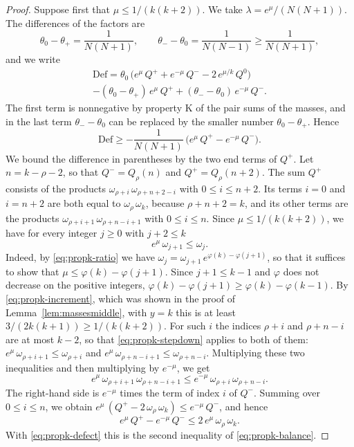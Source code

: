 \documentclass{amsart}
\theoremstyle{definition}
\theoremstyle{remark}
\numberwithin{equation}{section}
\begin{document}
\begin{proof}
Suppose first that $\mu\le1/(k(k+2))$. We take $\lambda=e^{\mu}/(N(N+1))$.
The differences of the factors are
\[
\theta_0-\theta_+=\frac{1}{N(N+1)},\qquad
\theta_--\theta_0=\frac{1}{N(N-1)}\ge\frac{1}{N(N+1)} ,
\]
and we write
\begin{multline*}
\mathrm{Def}=\theta_0\,\bigl(e^{\mu}\,Q^{+}+e^{-\mu}\,Q^{-}
-2\,e^{\mu/k}\,Q^{0}\bigr)\\
-(\theta_0-\theta_+)\,e^{\mu}\,Q^{+}+(\theta_--\theta_0)\,e^{-\mu}\,Q^{-}.
\end{multline*}
The first term is nonnegative by property K of the pair sums of the masses,
and in the
last term $\theta_--\theta_0$ can be replaced by the smaller number
$\theta_0-\theta_+$. Hence
\begin{equation}\label{eq:propk-defect}
\mathrm{Def}\ge-\frac{1}{N(N+1)}\,
\bigl(e^{\mu}\,Q^{+}-e^{-\mu}\,Q^{-}\bigr).
\end{equation}
We bound the difference in parentheses by the two end terms of $Q^{+}$. Let
$n=k-\rho-2$, so that $Q^{-}=Q_\rho(n)$ and $Q^{+}=Q_\rho(n+2)$. The sum
$Q^{+}$ consists of the products $\omega_{\rho+i}\,\omega_{\rho+n+2-i}$
with $0\le i\le n+2$. Its terms $i=0$ and $i=n+2$ are both equal to
$\omega_\rho\,\omega_k$, because $\rho+n+2=k$, and its other terms are the
products $\omega_{\rho+i+1}\,\omega_{\rho+n-i+1}$ with $0\le i\le n$.
Since $\mu\le1/(k(k+2))$, we have for every integer $j\ge0$ with $j+2\le k$
\begin{equation}\label{eq:propk-stepdown}
e^{\mu}\,\omega_{j+1}\le\omega_j .
\end{equation}
Indeed, by \eqref{eq:propk-ratio} we have
$\omega_j=\omega_{j+1}\,e^{\varphi(k)-\varphi(j+1)}$, so that it suffices to
show that $\mu\le\varphi(k)-\varphi(j+1)$. Since $j+1\le k-1$ and $\varphi$
does not decrease on the positive integers,
$\varphi(k)-\varphi(j+1)\ge\varphi(k)-\varphi(k-1)$. By
\eqref{eq:propk-increment}, which was shown in the proof of
Lemma~\ref{lem:massesmiddle}, with $y=k$ this is at least
$3/(2k(k+1))\ge1/(k(k+2))$. For
such $i$ the indices $\rho+i$ and $\rho+n-i$ are at most $k-2$, so that
\eqref{eq:propk-stepdown} applies to both of them:
$e^{\mu}\,\omega_{\rho+i+1}\le\omega_{\rho+i}$ and
$e^{\mu}\,\omega_{\rho+n-i+1}\le\omega_{\rho+n-i}$. Multiplying these two
inequalities and then multiplying by $e^{-\mu}$, we get
\[
e^{\mu}\,\omega_{\rho+i+1}\,\omega_{\rho+n-i+1}
\le e^{-\mu}\,\omega_{\rho+i}\,\omega_{\rho+n-i} .
\]
The right-hand side is $e^{-\mu}$ times the term of index $i$ of $Q^{-}$.
Summing over $0\le i\le n$, we obtain
$e^{\mu}\,(Q^{+}-2\,\omega_\rho\,\omega_k)\le e^{-\mu}\,Q^{-}$, and hence
\[
e^{\mu}\,Q^{+}-e^{-\mu}\,Q^{-}\le2\,e^{\mu}\,\omega_\rho\,\omega_k .
\]
With \eqref{eq:propk-defect} this is the second inequality of
\eqref{eq:propk-balance}.


\end{proof}
\end{document}

